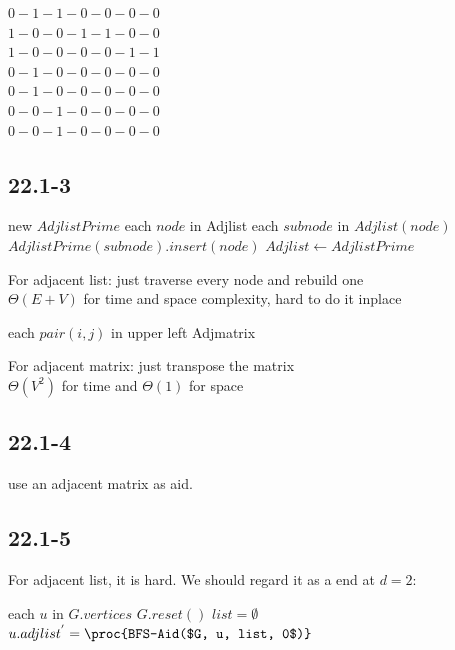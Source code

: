 \documentclass[]{article}
\begin{document}
$0-1-1-0-0-0-0$\\
$1-0-0-1-1-0-0$\\
$1-0-0-0-0-1-1$\\
$0-1-0-0-0-0-0$\\
$0-1-0-0-0-0-0$\\
$0-0-1-0-0-0-0$\\
$0-0-1-0-0-0-0$

\subsection{22.1-3}

\begin{codebox}
	\li new $AdjlistPrime$
	\li \For each $node$ in Adjlist
	\li		\Do \For each $subnode$ in $Adjlist(node)$
	\li 		\Do $AdjlistPrime(subnode).insert(node)$
	\li $Adjlist \gets AdjlistPrime$
	\End
\end{codebox}

For adjacent list: just traverse every node and rebuild one\\
$\Theta (E+V)$ for time and space complexity, hard to do it inplace\\

\begin{codebox}
	\li \For each $pair(i,j)$ in upper left Adjmatrix
	\li		\Do {}
	\End
\end{codebox}

For adjacent matrix: just transpose the matrix\\
$\Theta (V^2)$ for time and $\Theta(1)$ for space

\subsection{22.1-4}
use an adjacent matrix as aid.

\subsection{22.1-5}

For adjacent list, it is hard. We should regard it as a  end at $d = 2$:

\begin{codebox}
	
	\li \For each $u$ in $G.vertices$
	\li 	\Do $G.reset()$
	\li     $list = \emptyset$
	\li 	$u.adjlist^{'} = \proc{BFS-Aid($G, u, list, 0$)}$
	\End
	\End
\end{codebox}
\end{document}
